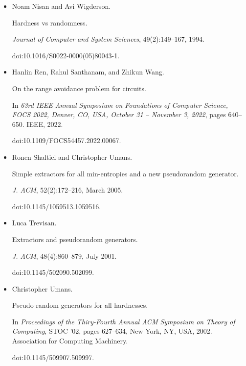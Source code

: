 \documentclass[10pt,a4paper]{article}
\begin{document}
\begin{itemize}
\emph{Journal of Computer and System Sciences}, 49(3):478–516, 1994.


30th IEEE Conference on Foundations of Computer Science.


doi:10.1016/S0022-0000(05)80069-8.





\item[] 
[26]

Noam Nisan and Avi Wigderson.


Hardness vs randomness.


\emph{Journal of Computer and System Sciences}, 49(2):149–167, 1994.


doi:10.1016/S0022-0000(05)80043-1.





\item[] 
[27]

Hanlin Ren, Rahul Santhanam, and Zhikun Wang.


On the range avoidance problem for circuits.


In \emph{63rd IEEE Annual Symposium on Foundations of Computer
Science, FOCS 2022, Denver, CO, USA, October 31 – November 3, 2022}, pages
640–650. IEEE, 2022.


doi:10.1109/FOCS54457.2022.00067.





\item[] 
[28]

Ronen Shaltiel and Christopher Umans.


Simple extractors for all min-entropies and a new pseudorandom
generator.


\emph{J. ACM}, 52(2):172–216, March 2005.


doi:10.1145/1059513.1059516.





\item[] 
[29]

Luca Trevisan.


Extractors and pseudorandom generators.


\emph{J. ACM}, 48(4):860–879, July 2001.


doi:10.1145/502090.502099.





\item[] 
[30]

Christopher Umans.


Pseudo-random generators for all hardnesses.


In \emph{Proceedings of the Thiry-Fourth Annual ACM Symposium on
Theory of Computing}, STOC ’02, pages 627–634, New York, NY, USA, 2002.
Association for Computing Machinery.


doi:10.1145/509907.509997.





\end{itemize}
\end{document}
